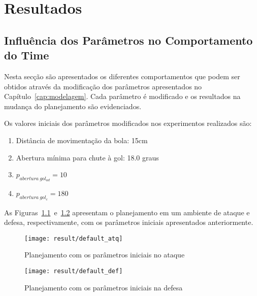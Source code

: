 \chapter{Resultados}\label{cap:resultados}



\section{Influência dos Parâmetros no Comportamento do Time}

Nesta secção são apresentados os diferentes comportamentos
que podem ser obtidos através da modificação dos parâmetros
apresentados no Capítulo~\ref{cap:modelagem}. Cada parâmetro
é modificado e os resultados na mudança do planejamento são
evidenciados.

Os valores iniciais dos parâmetros modificados nos experimentos
realizados são:

\begin{enumerate}
  \item Distância de movimentação da bola: 15cm
  \item Abertura mínima para chute à gol: 18.0 graus
  \item $p_{abertura{\ }gol_{ad}} = 10$
  \item $p_{abertura{\ }gol_{c}} = 180$
\end{enumerate}

As Figuras~\ref{fig:default_atq}~e~\ref{fig:default_def} apresentam
o planejamento em um ambiente de ataque e defesa, respectivamente,
com os parâmetros iniciais apresentados anteriormente.

\begin{figure}[H]
  \centering
  \texttt{[image: result/default\_atq]}
  \caption{Planejamento com os parâmetros iniciais no
           ataque}\label{fig:default_atq}
\end{figure}
\begin{figure}[H]
  \centering
  \texttt{[image: result/default\_def]}
  \caption{Planejamento com os parâmetros iniciais
           na defesa}\label{fig:default_def}
\end{figure}

